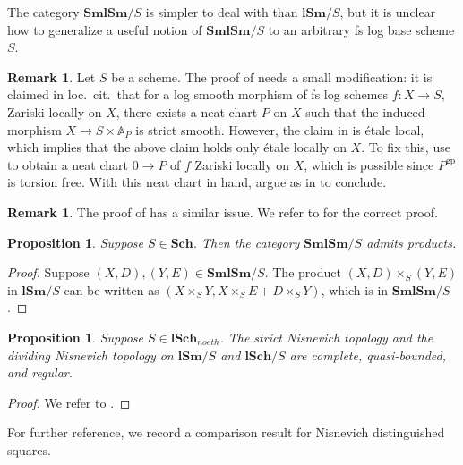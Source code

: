 \documentclass[11pt, a4paper]{amsart}
\newtheorem{prop}[thm]{Proposition}
\theoremstyle{definition}
\newtheorem{rmk}[thm]{Remark}
\numberwithin{equation}{subsection}
\newcommand{\A}{\mathbb{A}}
\newcommand{\Sch}{\mathbf{Sch}}
\newcommand{\lSch}{\mathbf{lSch}}
\newcommand{\lSm}{\mathbf{lSm}}
\newcommand{\SmlSm}{\mathbf{SmlSm}}
\newcommand{\gp}{{\mathrm{gp}}}
\begin{document}
The category $\SmlSm/S$ is simpler to deal with than $\lSm/S$, 
but it is unclear how to generalize a useful notion of $\SmlSm/S$ to an arbitrary fs log base scheme $S$.

\begin{rmk}
\label{logtop.9}Let $S$ be a scheme.
The proof of \cite[Lemma A.5.9]{logDM} needs a small modification: it is claimed in loc.\ cit.\ that for a log smooth morphism of fs log schemes $f\colon X\to S$, Zariski locally on $X$,
there exists a neat chart $P$ on $X$ such that the induced morphism $X\to S\times \A_P$ is strict smooth.
However, the claim in \cite[Theorem IV.3.3.1]{Ogu} is \'etale local,
which implies that the above claim holds only \'etale locally on $X$.
To fix this,
use \cite[Theorem III.1.2.7(4)]{Ogu} to obtain a neat chart $0\to P$ of $f$ Zariski locally on $X$, 
which is possible since $P^\gp$ is torsion free.
With this neat chart in hand,
argue as in \cite[Theorem IV.3.3.1]{Ogu} to conclude.
\end{rmk}

\begin{rmk}
\label{logtop.10}
The proof of \cite[Lemma A.11.3]{logDM} has a similar issue.
We refer to \cite[Proposition 3.4.1]{Parthesis} for the correct proof.
\end{rmk}


\begin{prop}
\label{logtop.5}
Suppose $S\in \Sch$.
Then the category $\SmlSm/S$ admits products.
\end{prop}
\begin{proof}
Suppose $(X,D),(Y,E)\in \SmlSm/S$.
The product $(X,D)\times_S (Y,E)$ in $\lSm/S$ can be written as $(X\times_S Y,X\times_S E+D\times_S Y)$, which is in $\SmlSm/S$.
\end{proof}

\begin{prop}
\label{logtop.6}
Suppose $S\in \lSch_{noeth}$.
The strict Nisnevich topology and the dividing Nisnevich topology on $\lSm/S$ and $\lSch/S$ are complete, quasi-bounded, and regular.
\end{prop}
\begin{proof}
We refer to \cite[Proposition 3.3.30]{logDM}.
\end{proof}

For further reference, we record a comparison result for Nisnevich distinguished squares.
\end{document}
